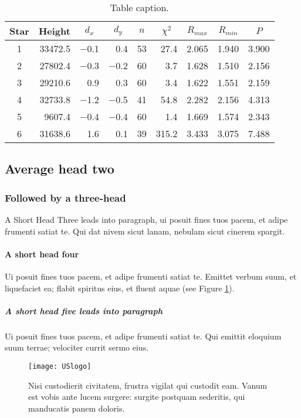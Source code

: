 \documentclass[linenumber]{jdsart}
\theoremstyle{plain}
\theoremstyle{remark}
\theoremstyle{definition}
\begin{document}
\begin{table}[t]
\caption{Table caption.}\label{tbl-2}
\begin{tabular*}{\textwidth}{@{\extracolsep{\fill}}crrrrrrrr@{}}
\hline
Star & Height & \multicolumn{1}{c}{$d_{x}$} &
\multicolumn{1}{c}{$d_{y}$} &
\multicolumn{1}{c}{$n$} &
\multicolumn{1}{c}{$\chi^2$} &
\multicolumn{1}{c}{$R_{max}$} &
\multicolumn{1}{c}{$R_{min}$} &
\multicolumn{1}{c}{$P$}  \\
\hline
1 &33472.5 &$-$0.1 &0.4  &53 &27.4  &2.065  &1.940 &3.900\\
2 &27802.4 &$-$0.3 &$-$0.2 &60 &3.7   &1.628  &1.510 &2.156\\
3 &29210.6 &0.9  &0.3  &60 &3.4   &1.622  &1.551 &2.159\\
4 &32733.8 &$-$1.2 &$-$0.5 &41 &54.8  &2.282  &2.156 &4.313\\
5 & 9607.4 &$-$0.4 &$-$0.4 &60 &1.4   &1.669  &1.574 &2.343\\
6 &31638.6 &1.6  &0.1  &39 &315.2 & 3.433 &3.075 &7.488\\
\hline
\end{tabular*}
\end{table}


\subsection{Average head two}

\subsubsection{Followed by a three-head}

A Short Head Three leads into paragraph, ui posuit fines tuos pacem,
et adipe frumenti satiat te. Qui dat nivem sicut lanam, nebulam
sicut cinerem spargit.

\paragraph{A short head four}
Ui posuit fines tuos pacem,
et adipe frumenti satiat te. Emittet verbum suum, et
liquefaciet ea; flabit spiritus eius, et fluent aquae (see Figure \ref{f1}).

\subparagraph{A short head five leads into paragraph} Ui posuit fines tuos pacem,
et adipe frumenti satiat te. Qui emittit eloquium suum terrae;
velociter currit sermo eius.

\begin{figure}[t]
\texttt{[image: USlogo]}%
\caption{Nisi custodierit civitatem, frustra vigilat qui custodit eam. Vanum
est vobis ante lucem surgere: surgite postquam sederitis, qui
manducatis panem doloris.}\label{f1}
\end{figure}
\end{document}
